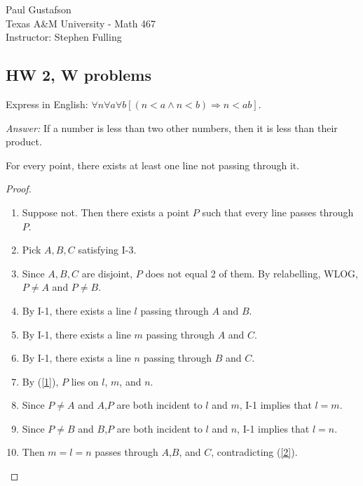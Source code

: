 \documentclass{article}
\begin{document}
\noindent Paul Gustafson\\
\noindent Texas A\&M University - Math 467\\ 
\noindent Instructor: Stephen Fulling

\subsection*{HW 2, W problems}
 Express in English: $\forall n \forall a \forall b \left[ (n < a \wedge n < b) \Rightarrow n<ab \right]$.

\emph{Answer:}
If a number is less than two other numbers, then it is less than their product.
\qedhere

For every point, there exists at least one line not passing through it.
\begin{proof} 

\begin{enumerate}
\item \label{1} Suppose not.  Then there exists a point $P$ such that every line passes through $P$.
\item \label{2} Pick $A,B,C$ satisfying I-3.
\item Since $A,B,C$ are disjoint, $P$ does not equal 2 of them. By relabelling, WLOG, $P \ne A$ and $P \ne B$.
\item By I-1, there exists a line $l$ passing through $A$ and $B$.
\item By I-1, there exists a line $m$ passing through $A$ and $C$.
\item By I-1, there exists a line $n$ passing through $B$ and $C$.
\item By (\ref{1}), $P$ lies on $l$, $m$, and $n$. 
\item Since $P \ne A$ and $A$,$P$ are both incident to $l$ and $m$, I-1 implies that $l = m$.
\item Since $P \ne B$ and $B$,$P$ are both incident to $l$ and $n$, I-1 implies that $l = n$.
\item Then $m = l = n$ passes through $A$,$B$, and $C$, contradicting (\ref{2}).
\end{enumerate}
\end{proof}
\end{document}
